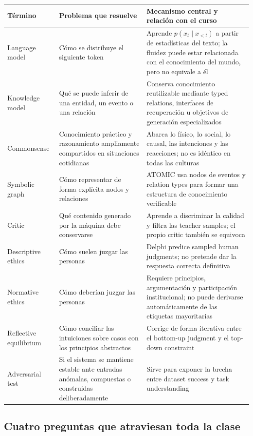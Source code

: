 \documentclass[a4paper]{article}
\begin{document}
\begin{longtable}{@{}L{0.19\textwidth}L{0.27\textwidth}L{0.42\textwidth}@{}}
\toprule
Término & Problema que resuelve & Mecanismo central y relación con el curso \\
\midrule
Language model & Cómo se distribuye el siguiente token & Aprende $p(x_t\mid x_{<t})$ a partir de estadísticas del texto; la fluidez puede estar relacionada con el conocimiento del mundo, pero no equivale a él \\
Knowledge model & Qué se puede inferir de una entidad, un evento o una relación & Conserva conocimiento reutilizable mediante typed relations, interfaces de recuperación u objetivos de generación especializados \\
Commonsense & Conocimiento práctico y razonamiento ampliamente compartidos en situaciones cotidianas & Abarca lo físico, lo social, lo causal, las intenciones y las reacciones; no es idéntico en todas las culturas \\
Symbolic graph & Cómo representar de forma explícita nodos y relaciones & ATOMIC usa nodos de eventos y relation types para formar una estructura de conocimiento verificable \\
Critic & Qué contenido generado por la máquina debe conservarse & Aprende a discriminar la calidad y filtra las teacher samples; el propio critic también se equivoca \\
Descriptive ethics & Cómo suelen juzgar las personas & Delphi predice sampled human judgments; no pretende dar la respuesta correcta definitiva \\
Normative ethics & Cómo deberían juzgar las personas & Requiere principios, argumentación y participación institucional; no puede derivarse automáticamente de las etiquetas mayoritarias \\
Reflective equilibrium & Cómo conciliar las intuiciones sobre casos con los principios abstractos & Corrige de forma iterativa entre el bottom-up judgment y el top-down constraint \\
Adversarial test & Si el sistema se mantiene estable ante entradas anómalas, compuestas o construidas deliberadamente & Sirve para exponer la brecha entre dataset success y task understanding \\
\bottomrule
\end{longtable}

\subsection{Cuatro preguntas que atraviesan toda la clase}
\end{document}

